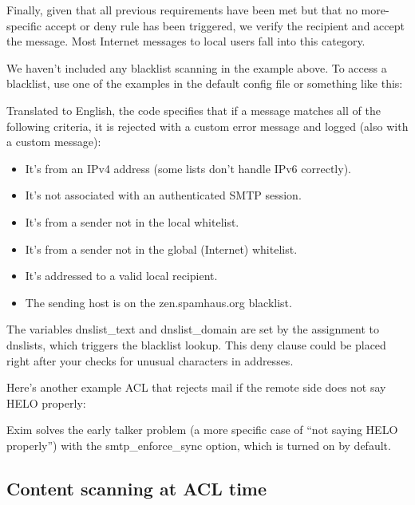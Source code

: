 
Finally, given that all previous requirements have been met but that no
more-{specific} {accept} or {deny} rule has been triggered, we verify
the recipient and accept the message. Most Internet messages to local
users fall into this category.

\protect\hypertarget{part0026_split_047.htmlux5cux23_idTextAnchor1141}{}{}We
haven't included any blacklist scanning in the example above. To access
a blacklist, use one of the examples in the default config file or
something like this:


Translated to English, the code specifies that if a message matches
{all} of the following criteria, it is rejected with a custom error
message and logged (also with a custom message):

\begin{itemize}
\tightlist
\item
  It's from an IPv4 address (some lists don't handle IPv6 correctly).
\item
  It's not associated with an authenticated SMTP session.
\item
  It's from a sender not in the local whitelist.
\item
  It's from a sender not in the global (Internet) whitelist.
\item
  It's addressed to a valid local recipient.
\item
  The sending host is on the zen.spamhaus.org blacklist.
\end{itemize}

The variables {dnslist\_text} and {dnslist\_domain} are set by the
assignment to {dnslists}, which triggers the blacklist lookup. This
{deny} clause could be placed right after your checks for unusual
characters in addresses.

Here's another example ACL that rejects mail if the remote side does not
say HELO properly:


Exim solves the early talker problem (a more specific case of ``not
saying HELO properly'') with the {smtp\_enforce\_sync} option, which is
turned on by default.

\protect\hypertarget{part0026_split_048.html}{}{}

\hypertarget{part0026_split_048.htmlux5cux23_idContainer1247}{}
\hypertarget{part0026_split_048.htmlux5cux23calibre_pb_47}{%
\subsection[Content scanning at ACL
time]{\texorpdfstring{\protect\hypertarget{part0026_split_048.htmlux5cux23_idTextAnchor1142}{}{}Con\protect\hypertarget{part0026_split_048.htmlux5cux23_idTextAnchor1143}{}{}tent
scanning at ACL
time}{Content scanning at ACL time}}\label{part0026_split_048.htmlux5cux23calibre_pb_47}}

